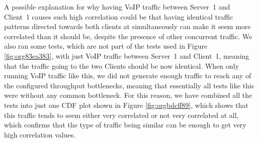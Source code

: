 \documentclass[a4paper,11pt]{article}
\begin{document}
A possible explanation for why having VoIP traffic between Server~1 and Client~1 causes such high correlation could be that having identical traffic patterns directed towards both clients at simultaneously can make it seem more correlated than it should be, despite the presence of other concurrent traffic. We also ran some tests, which are not part of the tests used in Figure \ref{fig:org83ea383}, with just VoIP traffic between Server~1 and Client~1, meaning that the traffic going to the two Clients should be now identical. When only running VoIP traffic like this, we did not generate enough traffic to reach any of the configured throughput bottlenecks, meaning that essentially all tests like this were without any common bottleneck. For this reason, we have combined all the tests into just one CDF plot shown in Figure \ref{fig:orgbdcff89}, which shows that this traffic tends to seem either very correlated or not very correlated at all, which confirms that the type of traffic being similar can be enough to get very high correlation values.
\end{document}
